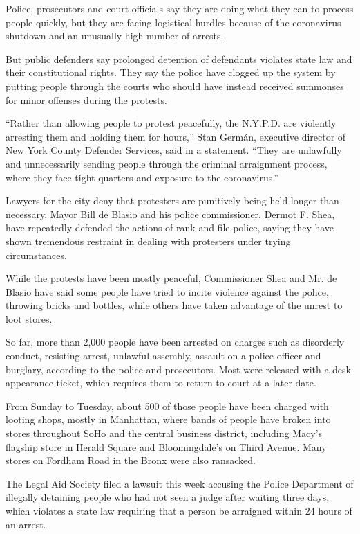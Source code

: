 Police, prosecutors and court officials say they are doing what they can
to process people quickly, but they are facing logistical hurdles
because of the coronavirus shutdown and an unusually high number of
arrests.

But public defenders say prolonged detention of defendants violates
state law and their constitutional rights. They say the police have
clogged up the system by putting people through the courts who should
have instead received summonses for minor offenses during the protests.

``Rather than allowing people to protest peacefully, the N.Y.P.D. are
violently arresting them and holding them for hours,'' Stan Germán,
executive director of New York County Defender Services, said in a
statement. ``They are unlawfully and unnecessarily sending people
through the criminal arraignment process, where they face tight quarters
and exposure to the coronavirus.''

Lawyers for the city deny that protesters are punitively being held
longer than necessary. Mayor Bill de Blasio and his police commissioner,
Dermot F. Shea, have repeatedly defended the actions of rank-and file
police, saying they have shown tremendous restraint in dealing with
protesters under trying circumstances.

While the protests have been mostly peaceful, Commissioner Shea and Mr.
de Blasio have said some people have tried to incite violence against
the police, throwing bricks and bottles, while others have taken
advantage of the unrest to loot stores.

So far, more than 2,000 people have been arrested on charges such as
disorderly conduct, resisting arrest, unlawful assembly, assault on a
police officer and burglary, according to the police and prosecutors.
Most were released with a desk appearance ticket, which requires them to
return to court at a later date.

From Sunday to Tuesday, about 500 of those people have been charged with
looting shops, mostly in Manhattan, where bands of people have broken
into stores throughout SoHo and the central business district, including
\href{https://www.nytimes3xbfgragh.onion/2020/06/02/nyregion/nyc-looting-protests.html}{Macy's
flagship store in Herald Square} and Bloomingdale's on Third Avenue.
Many stores on
\href{https://www.nytimes3xbfgragh.onion/2020/06/03/nyregion/george-floyd-bronx-protests-looting.html}{Fordham
Road in the Bronx were also ransacked.}

The Legal Aid Society filed a lawsuit this week accusing the Police
Department of illegally detaining people who had not seen a judge after
waiting three days, which violates a state law requiring that a person
be arraigned within 24 hours of an arrest.

